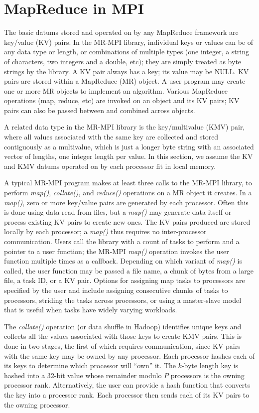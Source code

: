 \section{MapReduce in MPI}
\label{sec:mr}

The basic datums stored and operated on by any MapReduce framework are
key/value (KV) pairs.  In the MR-MPI library, individual keys or
values can be of any data type or length, or combinations of multiple
types (one integer, a string of characters, two integers and a double,
etc); they are simply treated as byte strings by the library.  A KV
pair always has a key; its value may be NULL.  KV pairs are stored
within a MapReduce (MR) object.  A user program may create one or more
MR objects to implement an algorithm.  Various MapReduce operations
(map, reduce, etc) are invoked on an object and its KV pairs; KV pairs
can also be passed between and combined across objects.

A related data type in the MR-MPI library is the key/multivalue (KMV)
pair, where all values associated with the same key are collected and
stored contiguously as a multivalue, which is just a longer byte
string with an associated vector of lengths, one integer length per
value.  In this section, we assume the KV and KMV datums operated on
by each processor fit in local memory.

A typical MR-MPI program makes at least three calls to the MR-MPI
library, to perform {\it map()}, {\it collate()}, and {\it reduce()}
operations on a MR object it creates.  In a {\it map()}, zero or more
key/value pairs are generated by each processor.  Often this is done
using data read from files, but a {\it map()} may generate data itself
or process existing KV pairs to create new ones.  The KV pairs
produced are stored locally by each processor; a {\it map()} thus
requires no inter-processor communication.  Users call the library
with a count of tasks to perform and a pointer to a user function; the
MR-MPI {\it map()} operation invokes the user function multiple times
as a callback.  Depending on which variant of {\it map()} is called,
the user function may be passed a file name, a chunk of bytes from a
large file, a task ID, or a KV pair.  Options for assigning map tasks
to processors are specified by the user and include assigning
consecutive chunks of tasks to processors, striding the tasks across
processors, or using a master-slave model that is useful when tasks
have widely varying workloads.

The {\it collate()} operation (or data shuffle in Hadoop) identifies
unique keys and collects all the values associated with those keys to
create KMV pairs.  This is done in two stages, the first of which
requires communication, since KV pairs with the same key may be owned
by any processor.  Each processor hashes each of its keys to determine
which processor will ``own'' it.  The $k$-byte length key is hashed
into a 32-bit value whose remainder modulo $P$ processors is the
owning processor rank.  Alternatively, the user can provide a hash
function that converts the key into a processor rank.  Each processor
then sends each of its KV pairs to the owning processor.

